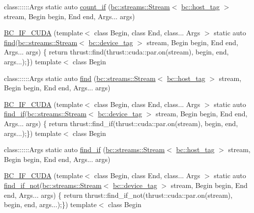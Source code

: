 \begin{DoxyCompactItemize}
\item 
class\+::::::\+Args static auto \hyperlink{namespacebc_1_1algorithms_aa3027db1b5fa7bf7ced1841792da560a}{count\+\_\+if} (\hyperlink{classbc_1_1streams_1_1Stream}{bc\+::streams\+::\+Stream}$<$ \hyperlink{structbc_1_1host__tag}{bc\+::host\+\_\+tag} $>$ stream, Begin begin, End end, Args... args)
\item 
\hyperlink{namespacebc_1_1algorithms_acbb5455c8fe9c5f9e530bab556b50351}{B\+C\+\_\+\+I\+F\+\_\+\+C\+U\+DA} (template$<$ class Begin, class End, class... Args $>$ static auto \hyperlink{namespacebc_1_1algorithms_afc2b2f65f158bc232b0245a1c1240580}{find}(\hyperlink{classbc_1_1streams_1_1Stream}{bc\+::streams\+::\+Stream}$<$ \hyperlink{structbc_1_1device__tag}{bc\+::device\+\_\+tag} $>$ stream, Begin begin, End end, Args... args) \{ return thrust\+::find(thrust\+::cuda\+::par.\+on(stream), begin, end, args...);\}) template$<$ class Begin
\item 
class\+::::::\+Args static auto \hyperlink{namespacebc_1_1algorithms_afc2b2f65f158bc232b0245a1c1240580}{find} (\hyperlink{classbc_1_1streams_1_1Stream}{bc\+::streams\+::\+Stream}$<$ \hyperlink{structbc_1_1host__tag}{bc\+::host\+\_\+tag} $>$ stream, Begin begin, End end, Args... args)
\item 
\hyperlink{namespacebc_1_1algorithms_af89c40742157456b78d3c5890c71decb}{B\+C\+\_\+\+I\+F\+\_\+\+C\+U\+DA} (template$<$ class Begin, class End, class... Args $>$ static auto \hyperlink{namespacebc_1_1algorithms_a92182a82cdfb1b0a6ad3e4d4e4367404}{find\+\_\+if}(\hyperlink{classbc_1_1streams_1_1Stream}{bc\+::streams\+::\+Stream}$<$ \hyperlink{structbc_1_1device__tag}{bc\+::device\+\_\+tag} $>$ stream, Begin begin, End end, Args... args) \{ return thrust\+::find\+\_\+if(thrust\+::cuda\+::par.\+on(stream), begin, end, args...);\}) template$<$ class Begin
\item 
class\+::::::\+Args static auto \hyperlink{namespacebc_1_1algorithms_a92182a82cdfb1b0a6ad3e4d4e4367404}{find\+\_\+if} (\hyperlink{classbc_1_1streams_1_1Stream}{bc\+::streams\+::\+Stream}$<$ \hyperlink{structbc_1_1host__tag}{bc\+::host\+\_\+tag} $>$ stream, Begin begin, End end, Args... args)
\item 
\hyperlink{namespacebc_1_1algorithms_a56b897a6a517f83757f23acd2ea8e909}{B\+C\+\_\+\+I\+F\+\_\+\+C\+U\+DA} (template$<$ class Begin, class End, class... Args $>$ static auto \hyperlink{namespacebc_1_1algorithms_a24ea4f55c7904296a82c1e6f6515cc46}{find\+\_\+if\+\_\+not}(\hyperlink{classbc_1_1streams_1_1Stream}{bc\+::streams\+::\+Stream}$<$ \hyperlink{structbc_1_1device__tag}{bc\+::device\+\_\+tag} $>$ stream, Begin begin, End end, Args... args) \{ return thrust\+::find\+\_\+if\+\_\+not(thrust\+::cuda\+::par.\+on(stream), begin, end, args...);\}) template$<$ class Begin

\end{DoxyCompactItemize}
